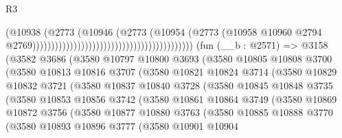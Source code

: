 \begin{lexlean}{R3}
\begin{coremodule}
                                                                            (@10938
                                                                              (@2773
                                                                                (@10946
                                                                                  (@2773
                                                                                    (@10954
                                                                                      (@2773
                                                                                        (@10958
                                                                                          @10960
                                                                                          @2794
                                                                                          @2769)))))))))))))))))))))))))))))))))))))))))))
    (fun (__b : @2571) =>
    @3158
      (@3582
        @3686
        (@3580
          @10797
          @10800
          @3693
          (@3580
            @10805
            @10808
            @3700
            (@3580
              @10813
              @10816
              @3707
              (@3580
                @10821
                @10824
                @3714
                (@3580
                  @10829
                  @10832
                  @3721
                  (@3580
                    @10837
                    @10840
                    @3728
                    (@3580
                      @10845
                      @10848
                      @3735
                      (@3580
                        @10853
                        @10856
                        @3742
                        (@3580
                          @10861
                          @10864
                          @3749
                          (@3580
                            @10869
                            @10872
                            @3756
                            (@3580
                              @10877
                              @10880
                              @3763
                              (@3580
                                @10885
                                @10888
                                @3770
                                (@3580
                                  @10893
                                  @10896
                                  @3777
                                  (@3580
                                    @10901
                                    @10904

\end{coremodule}
\end{lexlean}
